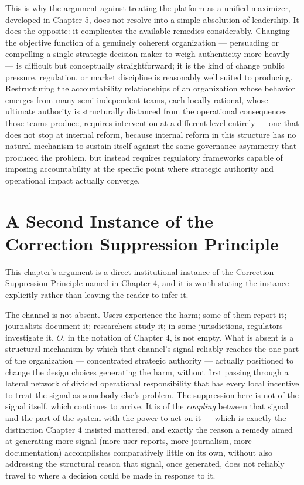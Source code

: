 \documentclass[12pt,a4paper]{book}
\begin{document}
This is why the argument against treating the platform as a unified maximizer, developed in Chapter 5, does not resolve into a simple absolution of leadership. It does the opposite: it complicates the available remedies considerably. Changing the objective function of a genuinely coherent organization — persuading or compelling a single strategic decision-maker to weigh authenticity more heavily — is difficult but conceptually straightforward; it is the kind of change public pressure, regulation, or market discipline is reasonably well suited to producing. Restructuring the accountability relationships of an organization whose behavior emerges from many semi-independent teams, each locally rational, whose ultimate authority is structurally distanced from the operational consequences those teams produce, requires intervention at a different level entirely — one that does not stop at internal reform, because internal reform in this structure has no natural mechanism to sustain itself against the same governance asymmetry that produced the problem, but instead requires regulatory frameworks capable of imposing accountability at the specific point where strategic authority and operational impact actually converge.

\section{A Second Instance of the Correction Suppression Principle}

This chapter's argument is a direct institutional instance of the Correction Suppression Principle named in Chapter 4, and it is worth stating the instance explicitly rather than leaving the reader to infer it.

The channel is not absent. Users experience the harm; some of them report it; journalists document it; researchers study it; in some jurisdictions, regulators investigate it. $O$, in the notation of Chapter 4, is not empty. What is absent is a structural mechanism by which that channel's signal reliably reaches the one part of the organization — concentrated strategic authority — actually positioned to change the design choices generating the harm, without first passing through a lateral network of divided operational responsibility that has every local incentive to treat the signal as somebody else's problem. The suppression here is not of the signal itself, which continues to arrive. It is of the \emph{coupling} between that signal and the part of the system with the power to act on it — which is exactly the distinction Chapter 4 insisted mattered, and exactly the reason a remedy aimed at generating more signal (more user reports, more journalism, more documentation) accomplishes comparatively little on its own, without also addressing the structural reason that signal, once generated, does not reliably travel to where a decision could be made in response to it.
\end{document}
